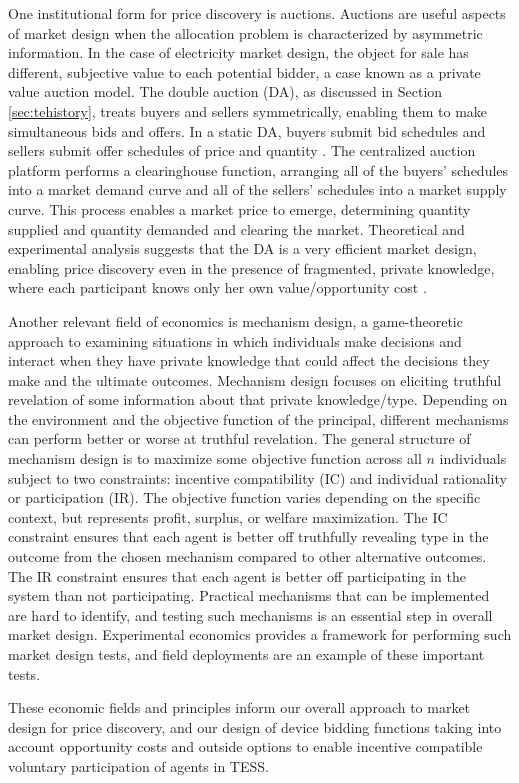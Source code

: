 One institutional form for price discovery is auctions. Auctions are useful aspects of market design when the allocation problem is characterized by asymmetric information. In the case of electricity market design, the object for sale has different, subjective value to each potential bidder, a case known as a private value auction model. The double auction (DA), as discussed in Section \ref{sec:tehistory}, treats buyers and sellers symmetrically, enabling them to make simultaneous bids and offers. In a static DA, buyers submit bid schedules and sellers submit offer schedules of price and quantity \citep{friedman1993double}. The centralized auction platform performs a clearinghouse function, arranging all of the buyers’ schedules into a market demand curve and all of the sellers’ schedules into a market supply curve. This process enables a market price to emerge, determining quantity supplied and quantity demanded and clearing the market. Theoretical and experimental analysis suggests that the DA is a very efficient market design, enabling price discovery even in the presence of fragmented, private knowledge, where each participant knows only her own value/opportunity cost \citep{easley1993theories}.

Another relevant field of economics is mechanism design, a game-theoretic approach to examining situations in which individuals make decisions and interact when they have private knowledge that could affect the decisions they make and the ultimate outcomes. Mechanism design focuses on eliciting truthful revelation of some information about that private knowledge/type. Depending on the environment and the objective function of the principal, different mechanisms can perform better or worse at truthful revelation.
The general structure of mechanism design is to maximize some objective function across all $n$ individuals subject to two constraints: incentive compatibility (IC) and individual rationality or participation (IR). The objective function varies depending on the specific context, but represents profit, surplus, or welfare maximization. The IC constraint ensures that each agent is better off truthfully revealing type in the outcome from the chosen mechanism compared to other alternative outcomes. The IR constraint ensures that each agent is better off participating in the system than not participating. 
Practical mechanisms that can be implemented are hard to identify, and testing such mechanisms is an essential step in overall market design. Experimental economics provides a framework for performing such market design tests, and field deployments are an example of these important tests.

These economic fields and principles inform our overall approach to market design for price discovery, and our design of device bidding functions taking into account opportunity costs and outside options to enable incentive compatible voluntary participation of agents in TESS.



